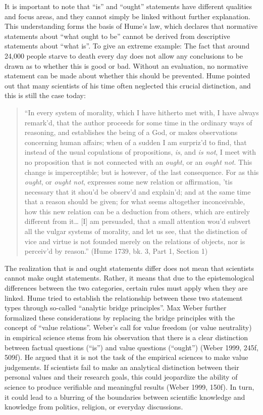 \documentclass[
  a4paper,
  DIV=11,
  numbers=noendperiod,
  oneside,
  openany]{scrreprt}
\begin{document}
It is important to note that ``is'' and ``ought'' statements have
different qualities and focus areas, and they cannot simply be linked
without further explanation. This understanding forms the basis of
Hume's law, which declares that normative statements about ``what ought
to be'' cannot be derived from descriptive statements about ``what is''.
To give an extreme example: The fact that around 24,000 people starve to
death every day does not allow any conclusions to be drawn as to whether
this is good or bad. Without an evaluation, no normative statement can
be made about whether this should be prevented. Hume pointed out that
many scientists of his time often neglected this crucial distinction,
and this is still the case today:

\begin{quote}
``In every system of morality, which I have hitherto met with, I have
always remark'd, that the author proceeds for some time in the ordinary
ways of reasoning, and establishes the being of a God, or makes
observations concerning human affairs; when of a sudden I am surpriz'd
to find, that instead of the usual copulations of propositions,
\emph{is}, and \emph{is not}, I meet with no proposition that is not
connected with an \emph{ought}, or an \emph{ought not}. This change is
imperceptible; but is however, of the last consequence. For as this
\emph{ought}, or \emph{ought not}, expresses some new relation or
affirmation, 'tis necessary that it shou'd be observ'd and explain'd;
and at the same time that a reason should be given; for what seems
altogether inconceivable, how this new relation can be a deduction from
others, which are entirely different from it\ldots{} {[}I{]} am
persuaded, that a small attention wou'd subvert all the vulgar systems
of morality, and let us see, that the distinction of vice and virtue is
not founded merely on the relations of objects, nor is perceiv'd by
reason.'' (Hume 1739, bk. 3, Part 1, Section 1)
\end{quote}

The realization that is and ought statements differ does not mean that
scientists cannot make ought statements. Rather, it means that due to
the epistemological differences between the two categories, certain
rules must apply when they are linked. Hume tried to establish the
relationship between these two statement types through so-called
``analytic bridge principles''. Max Weber further formalized these
considerations by replacing the bridge principles with the concept of
``value relations''. Weber's call for value freedom (or value
neutrality) in empirical science stems from his observation that there
is a clear distinction between factual questions (``is'') and value
questions (``ought'') (Weber 1999, 245f, 509f). He argued that it is not
the task of the empirical sciences to make value judgements. If
scientists fail to make an analytical distinction between their personal
values and their research goals, this could jeopardize the ability of
science to produce verifiable and meaningful results (Weber 1999, 150f).
In turn, it could lead to a blurring of the boundaries between
scientific knowledge and knowledge from politics, religion, or everyday
discussions.
\end{document}
